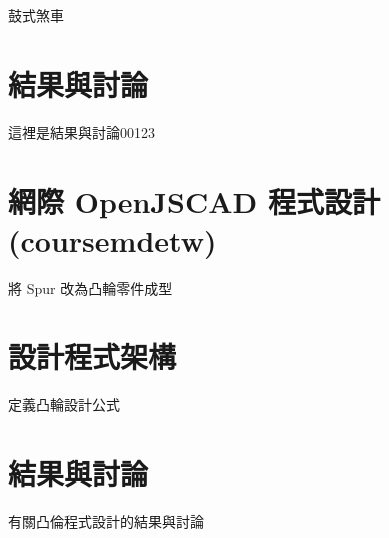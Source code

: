 \documentclass[]{article}
\begin{document}
鼓式煞車

\section{結果與討論}\label{ux7d50ux679cux8207ux8a0eux8ad6-14}

這裡是結果與討論00123

\section{網際 OpenJSCAD
程式設計(coursemdetw)}\label{ux7db2ux969b-openjscad-ux7a0bux5f0fux8a2dux8a08coursemdetw}

將 Spur 改為凸輪零件成型

\section{設計程式架構}\label{ux8a2dux8a08ux7a0bux5f0fux67b6ux69cb-1}

定義凸輪設計公式

\section{結果與討論}\label{ux7d50ux679cux8207ux8a0eux8ad6-15}

有關凸倫程式設計的結果與討論
\end{document}
